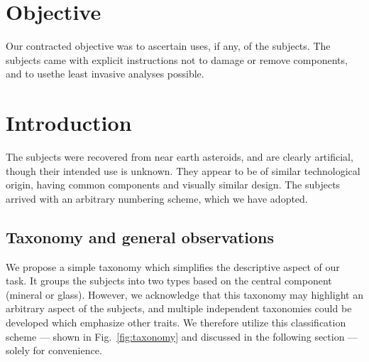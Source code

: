 \documentclass[10pt]{article}
\theoremstyle{definition}
\begin{document}
\maketitle


\section{Objective}
Our contracted objective was to ascertain uses, if any, of the subjects.
The subjects came with explicit instructions not to damage or remove components, and to usethe least invasive analyses possible.

\section{Introduction}
The subjects were recovered from near earth asteroids, and are clearly artificial, though their intended use is unknown.
They appear to be of similar technological origin, having common components and visually similar design.
The subjects arrived with an arbitrary numbering scheme, which we have adopted.

\subsection{Taxonomy and general observations}\label{sec:taxonomy}
We propose a simple taxonomy which simplifies the descriptive aspect of our task.
It groups the subjects into two types based on the central component (mineral or glass).
However, we acknowledge that this taxonomy may highlight an arbitrary aspect of the subjects, and multiple independent taxonomies could be developed which emphasize other traits.
We therefore utilize this classification scheme --- shown in Fig.~\ref{fig:taxonomy} and discussed in the following section --- solely for convenience.
\end{document}
